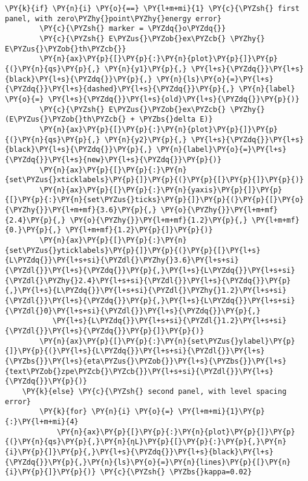 \begin{Verbatim}[commandchars=\\\{\}]
    \PY{k}{if} \PY{n}{i} \PY{o}{==} \PY{l+m+mi}{1} \PY{c}{\PYZsh{} first panel, with zero\PYZhy{}point\PYZhy{}energy error}
        \PY{c}{\PYZsh{} marker = \PYZdq{}o\PYZdq{}}
        \PY{c}{\PYZsh{} E\PYZus{}\PYZob{}ex\PYZcb{} \PYZhy{} E\PYZus{}\PYZob{}th\PYZcb{}}
        \PY{n}{ax}\PY{p}{[}\PY{p}{:}\PY{n}{plot}\PY{p}{]}\PY{p}{(}\PY{n}{qs}\PY{p}{,} \PY{n}{y1}\PY{p}{,} \PY{l+s}{\PYZdq{}}\PY{l+s}{black}\PY{l+s}{\PYZdq{}}\PY{p}{,} \PY{n}{ls}\PY{o}{=}\PY{l+s}{\PYZdq{}}\PY{l+s}{dashed}\PY{l+s}{\PYZdq{}}\PY{p}{,} \PY{n}{label} \PY{o}{=} \PY{l+s}{\PYZdq{}}\PY{l+s}{old}\PY{l+s}{\PYZdq{}}\PY{p}{)}
        \PY{c}{\PYZsh{} E\PYZus{}\PYZob{}ex\PYZcb{} \PYZhy{} (E\PYZus{}\PYZob{}th\PYZcb{} + \PYZbs{}delta E)}
        \PY{n}{ax}\PY{p}{[}\PY{p}{:}\PY{n}{plot}\PY{p}{]}\PY{p}{(}\PY{n}{qs}\PY{p}{,} \PY{n}{y2}\PY{p}{,} \PY{l+s}{\PYZdq{}}\PY{l+s}{black}\PY{l+s}{\PYZdq{}}\PY{p}{,} \PY{n}{label}\PY{o}{=}\PY{l+s}{\PYZdq{}}\PY{l+s}{new}\PY{l+s}{\PYZdq{}}\PY{p}{)}
        \PY{n}{ax}\PY{p}{[}\PY{p}{:}\PY{n}{set\PYZus{}xticklabels}\PY{p}{]}\PY{p}{(}\PY{p}{[}\PY{p}{]}\PY{p}{)}
        \PY{n}{ax}\PY{p}{[}\PY{p}{:}\PY{n}{yaxis}\PY{p}{]}\PY{p}{[}\PY{p}{:}\PY{n}{set\PYZus{}ticks}\PY{p}{]}\PY{p}{(}\PY{p}{[}\PY{o}{\PYZhy{}}\PY{l+m+mf}{3.6}\PY{p}{,} \PY{o}{\PYZhy{}}\PY{l+m+mf}{2.4}\PY{p}{,} \PY{o}{\PYZhy{}}\PY{l+m+mf}{1.2}\PY{p}{,} \PY{l+m+mf}{0.}\PY{p}{,} \PY{l+m+mf}{1.2}\PY{p}{]}\PY{p}{)}
        \PY{n}{ax}\PY{p}{[}\PY{p}{:}\PY{n}{set\PYZus{}yticklabels}\PY{p}{]}\PY{p}{(}\PY{p}{[}\PY{l+s}{L\PYZdq{}}\PY{l+s+si}{\PYZdl{}\PYZhy{}3.6}\PY{l+s+si}{\PYZdl{}}\PY{l+s}{\PYZdq{}}\PY{p}{,}\PY{l+s}{L\PYZdq{}}\PY{l+s+si}{\PYZdl{}\PYZhy{}2.4}\PY{l+s+si}{\PYZdl{}}\PY{l+s}{\PYZdq{}}\PY{p}{,}\PY{l+s}{L\PYZdq{}}\PY{l+s+si}{\PYZdl{}\PYZhy{}1.2}\PY{l+s+si}{\PYZdl{}}\PY{l+s}{\PYZdq{}}\PY{p}{,}\PY{l+s}{L\PYZdq{}}\PY{l+s+si}{\PYZdl{}0}\PY{l+s+si}{\PYZdl{}}\PY{l+s}{\PYZdq{}}\PY{p}{,}
           \PY{l+s}{L\PYZdq{}}\PY{l+s+si}{\PYZdl{}1.2}\PY{l+s+si}{\PYZdl{}}\PY{l+s}{\PYZdq{}}\PY{p}{]}\PY{p}{)}
        \PY{n}{ax}\PY{p}{[}\PY{p}{:}\PY{n}{set\PYZus{}ylabel}\PY{p}{]}\PY{p}{(}\PY{l+s}{L\PYZdq{}}\PY{l+s+si}{\PYZdl{}}\PY{l+s}{\PYZbs{}}\PY{l+s}{eta\PYZus{}\PYZob{}}\PY{l+s}{\PYZbs{}}\PY{l+s}{text\PYZob{}zpe\PYZcb{}\PYZcb{}}\PY{l+s+si}{\PYZdl{}}\PY{l+s}{\PYZdq{}}\PY{p}{)}
    \PY{k}{else} \PY{c}{\PYZsh{} second panel, with level spacing error}
        \PY{k}{for} \PY{n}{i} \PY{o}{=} \PY{l+m+mi}{1}\PY{p}{:}\PY{l+m+mi}{4}
            \PY{n}{ax}\PY{p}{[}\PY{p}{:}\PY{n}{plot}\PY{p}{]}\PY{p}{(}\PY{n}{qs}\PY{p}{,}\PY{n}{ηL}\PY{p}{[}\PY{p}{:}\PY{p}{,}\PY{n}{i}\PY{p}{]}\PY{p}{,}\PY{l+s}{\PYZdq{}}\PY{l+s}{black}\PY{l+s}{\PYZdq{}}\PY{p}{,}\PY{n}{ls}\PY{o}{=}\PY{n}{lines}\PY{p}{[}\PY{n}{i}\PY{p}{]}\PY{p}{)} \PY{c}{\PYZsh{} \PYZbs{}kappa=0.02}

\end{Verbatim}
